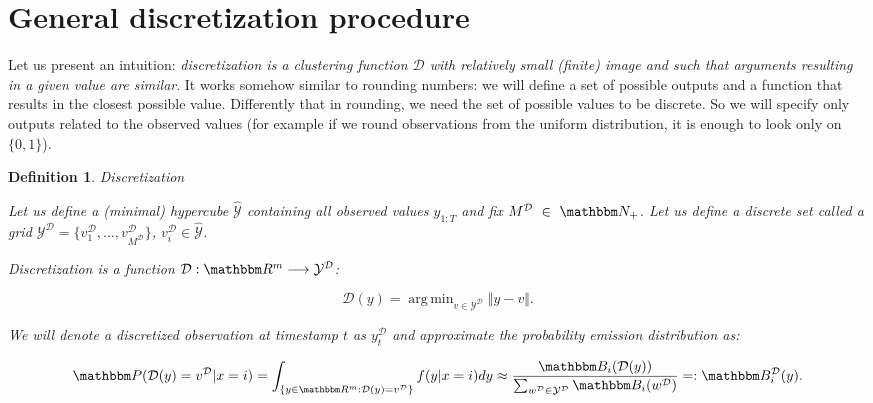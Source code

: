 \documentclass[shortabstract]{iithesis}
\DeclareMathOperator*{\argmin}{arg\,min}
\newtheorem{definition}{Definition}
\begin{document}
\section{General discretization procedure}  \label{sec:discretization}

Let us present an intuition: \textit{discretization is a clustering function $\mathcal D$ with relatively small (finite) image and such that arguments resulting in a given value are similar}. \linebreak It works somehow similar to rounding numbers: we will define a set of possible outputs and a function that results in the closest possible value. Differently that in rounding, we need the set of possible values to be discrete. So we will specify only outputs related to the observed values (for example if we round observations from the uniform distribution, it is enough to look only on $\{0, 1\}$).



\begin{definition}{Discretization}

    Let us define a (minimal) hypercube $\hat{\mathcal{Y}}$ containing all observed values $y_{1:T}$ and fix \linebreak $M^{\mathcal{D}}~\in~\mathbbm N_{+}$.
    Let us define a discrete set called a grid $\mathcal{Y}^{\mathcal{D}} = \{ v_1^{\mathcal{D}}, \ldots, v_{M^{\mathcal{D}}}^{\mathcal{D}} \}$, $v_i^{\mathcal D} \in \hat{\mathcal Y}$. 
    
    Discretization is a function $\mathcal D:  \mathbbm R^m \longrightarrow \mathcal{Y}^{\mathcal{D}}$:

    \begin{equation*}
        \mathcal D (y) = \argmin_{v \in \mathcal{Y}^{\mathcal{D}}} \Vert y - v \Vert\text{.}
    \end{equation*}

    We will denote a discretized observation at timestamp $t$ as $y_t^{\mathcal D}$ and approximate the probability emission distribution as:
    
    \begin{equation} \label{eq:prob_disc}
       \mathbbm P (\mathcal D (y) = v^{\mathcal D} | x = i) 
        = \int_{\{y\in \mathbbm R^m: \mathcal D (y) = v^{\mathcal D} \}} f(y|x = i) dy
        \approx 
        \frac{\mathbbm B_i(\mathcal D (y))}{\sum_{w^{\mathcal D} \in \mathcal{Y^{\mathcal D}}}\mathbbm B_i(w^{\mathcal D})} =: \mathbbm B_i^{\mathcal D}(y)\text{.}
    \end{equation}    

\end{definition}
\end{document}
